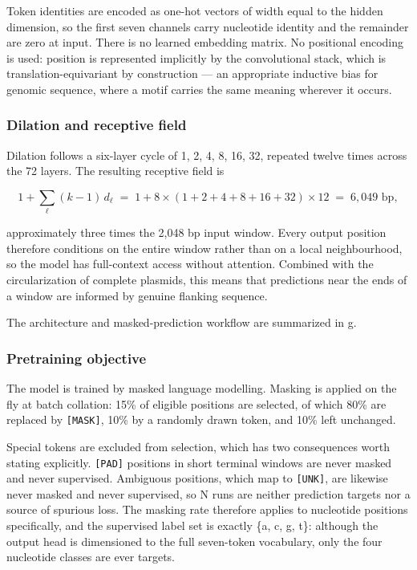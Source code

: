 Token identities are encoded as one-hot vectors of width equal to the hidden
dimension, so the first seven channels carry nucleotide identity and the
remainder are zero at input. There is no learned embedding matrix. No
positional encoding is used: position is represented implicitly by the
convolutional stack, which is translation-equivariant by construction --- an
appropriate inductive bias for genomic sequence, where a motif carries the
same meaning wherever it occurs.

\subsubsection*{Dilation and receptive field}

Dilation follows a six-layer cycle of 1, 2, 4, 8, 16, 32, repeated twelve
times across the 72 layers. The resulting receptive field is

\[1 + \sum_{\ell} (k - 1)\,d_\ell \;=\; 1 + 8 \times (1{+}2{+}4{+}8{+}16{+}32) \times 12 \;=\; 6{,}049 \text{ bp},\]

approximately three times the 2,048 bp input window. Every output position
therefore conditions on the entire window rather than on a local
neighbourhood, so the model has full-context access without attention.
Combined with the circularization of complete plasmids, this means that
predictions near the ends of a window are informed by genuine flanking
sequence.

The architecture and masked-prediction workflow are summarized in
g.

\subsubsection*{Pretraining objective}

The model is trained by masked language modelling. \cite{devlin2018bert}
Masking is applied on the fly at batch collation: 15\% of eligible positions
are selected, of which 80\% are replaced by \texttt{[MASK]}, 10\% by a
randomly drawn token, and 10\% left unchanged.

Special tokens are excluded from selection, which has two consequences worth
stating explicitly. \texttt{[PAD]} positions in short terminal windows are
never masked and never supervised. Ambiguous positions, which map to
\texttt{[UNK]}, are likewise never masked and never supervised, so N runs are
neither prediction targets nor a source of spurious loss. The masking rate
therefore applies to nucleotide positions specifically, and the supervised
label set is exactly \{a, c, g, t\}: although the output head is dimensioned
to the full seven-token vocabulary, only the four nucleotide classes are ever
targets.

